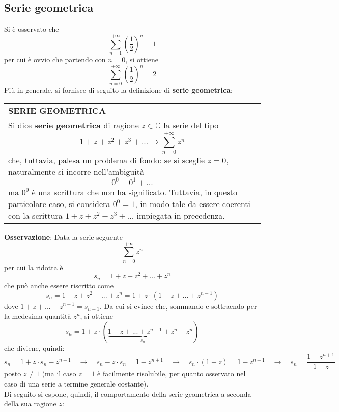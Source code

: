 \documentclass[a4paper]{extarticle}
\renewcommand\arraystretch{}
\begin{document}
\vspace{1em}
\noindent
\subsection{Serie geometrica}
Si è osservato che
\[\sum_{n=1}^{+\infty} \left(\frac{1}{2}\right)^n=1\]
per cui è ovvio che partendo con $n=0$, si ottiene
\[\sum_{n=0}^{+\infty} \left(\frac{1}{2}\right)^n=2\]
Più in generale, si fornisce di seguito la definizione di \textbf{serie geometrica}: 

\vspace{1em}
\setlength{\tabcolsep}{14pt}
\renewcommand{\arraystretch}{2}
\noindent
\begin{tabularx}{\textwidth}{@{}|P|@{}}
    \hline
    {\textbf{SERIE GEOMETRICA}}\\
    \parbox{\linewidth}{Si dice \textbf{serie geometrica} di ragione $z \in \mathbb{C}$ la serie del tipo
    \[1+z+z^2+z^3+... \rightarrow \sum_{n=0}^{+\infty} z^n\]
    che, tuttavia, palesa un problema di fondo: se si sceglie $z=0$, naturalmente si incorre nell'ambiguità
    \[0^0 + 0^1 + ...\]
    ma $0^0$ è una scrittura che non ha significato. Tuttavia, in questo particolare caso, si considera $0^0=1$, in modo tale da essere coerenti con la scrittura $1+z+z^2+z^3+...$ impiegata in precedenza.\vspace{3mm}}\\
    \hline
\end{tabularx}

\vspace{1em}
\noindent
\textbf{Osservazione}: Data la serie seguente
\[\sum_{n=0}^{+\infty} z^n\]
per cui la ridotta è
\[s_n=1+z+z^2+...+z^n\]
che può anche essere riscritto come
\[s_n=1+z+z^2+...+z^n=1+z \cdot \left(1+z+...+z^{n-1}\right)\]
dove $1+z+...+z^{n-1}=s_{n-1}$. Da cui si evince che, sommando e sottraendo per la medesima quantità $z^n$, si ottiene
\[s_n = 1+z \cdot \left(\underbrace{1+z+...+z^{n-1}+z^n}_{s_n} - z^n\right)\]
che diviene, quindi:
\[s_n = 1 + z \cdot s_n - z^{n+1} \hspace{1em} \rightarrow \hspace{1em} s_n - z \cdot s_n = 1 - z^{n+1} \hspace{1em} \rightarrow \hspace{1em} s_n \cdot (1-z) = 1 - z^{n+1} \hspace{1em} \rightarrow \hspace{1em} s_n = \frac{1-z^{n+1}}{1-z}\]
posto $z \neq 1$ (ma il caso $z=1$ è facilmente risolubile, per quanto osservato nel caso di una serie a termine generale costante).\\
Di seguito si espone, quindi, il comportamento della serie geometrica a seconda della sua ragione $z$:
\end{document}
